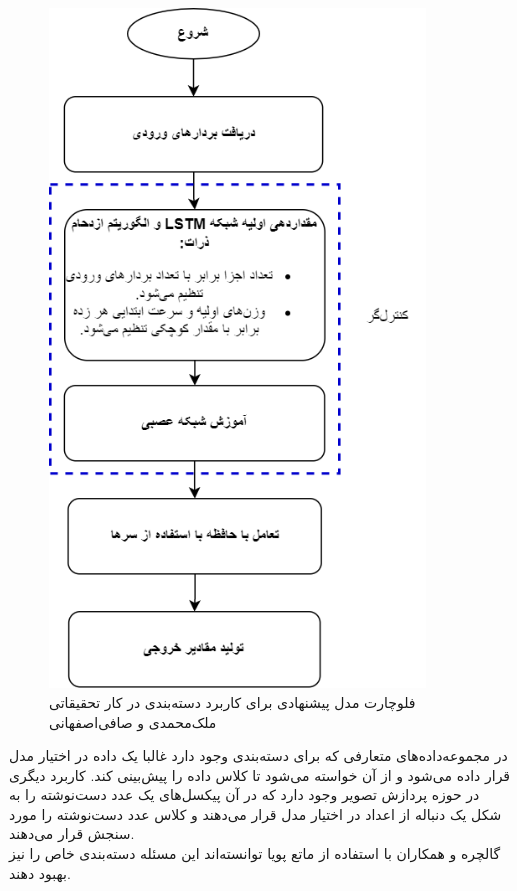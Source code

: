 \begin{figure}[!h]
\begin{center}
\includegraphics[height=18cm]{PSO-NTM.png}
\end{center}
\caption{فلوچارت مدل پیشنهادی برای کاربرد دسته‌بندی در کار تحقیقاتی ملک‌محمدی و صافی‌اصفهانی \cite{faradonbe2020classifier}} 
\end{figure}

در مجموعه‌داده‌های متعارفی که برای دسته‌بندی وجود دارد غالبا یک داده در اختیار مدل قرار داده می‌شود و از آن خواسته می‌شود تا کلاس داده را پیش‌بینی کند. کاربرد دیگری در حوزه پردازش تصویر وجود دارد که در آن پیکسل‌های یک عدد دست‌نوشته را به شکل یک دنباله از اعداد در اختیار مدل قرار می‌دهند و کلاس عدد دست‌نوشته را مورد سنجش قرار می‌دهند.
\\

گالچره و همکاران با استفاده از ماتع پویا توانسته‌اند این مسئله دسته‌بندی خاص را نیز بهبود دهند.\cite{gulcehre2018dynamic}

